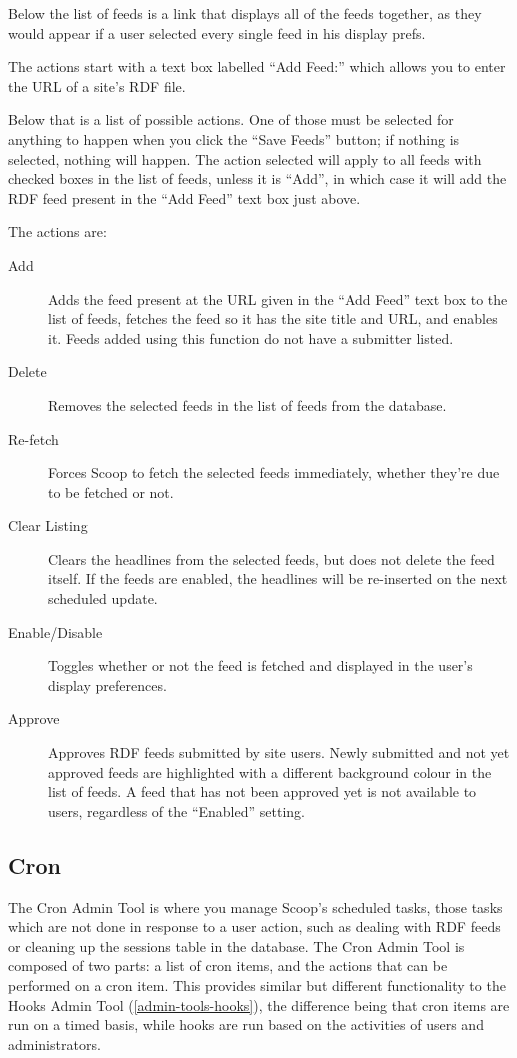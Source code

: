 Below the list of feeds is a link that displays all of the feeds together, as they would appear if a user selected every single feed in his display prefs.  

The actions start with a text box labelled ``Add Feed:'' which allows you to enter the URL of a site's RDF file.

Below that is a list of possible actions.  One of those must be selected for anything to happen when you click the ``Save Feeds'' button; if nothing is selected, nothing will happen.  The action selected will apply to all feeds with checked boxes in the list of feeds, unless it is ``Add'', in which case it will add the RDF feed present in the ``Add Feed'' text box just above.

The actions are:

\begin{description}
\item[Add] Adds the feed present at the URL given in the ``Add Feed'' text box to the list of feeds, fetches the feed so it has the site title and URL, and enables it.  Feeds added using this function do not have a submitter listed.
\item[Delete] Removes the selected feeds in the list of feeds from the database.
\item[Re-fetch] Forces Scoop to fetch the selected feeds immediately, whether they're due to be fetched or not.
\item[Clear Listing] Clears the headlines from the selected feeds, but does not delete the feed itself.  If the feeds are enabled, the headlines will be re-inserted on the next scheduled update.
\item[Enable/Disable] Toggles whether or not the feed is fetched and displayed in the user's display preferences.
\item[Approve] Approves RDF feeds submitted by site users.  Newly submitted and not yet approved feeds are highlighted with a different background colour in the list of feeds.  A feed that has not been approved yet is not available to users, regardless of the ``Enabled'' setting.
\end{description}

\subsection{Cron}
\label{admin-tools-cron}

The Cron Admin Tool is where you manage Scoop's scheduled tasks, those tasks which are not done in response to a user action, such as dealing with RDF feeds or cleaning up the sessions table in the database.  The Cron Admin Tool is composed of two parts: a list of cron items, and the actions that can be performed on a cron item. This provides similar but different functionality to the Hooks Admin Tool (\ref{admin-tools-hooks}), the difference being that cron items are run on a timed basis, while hooks are run based on the activities of users and administrators.

